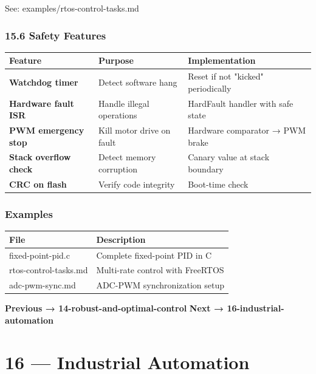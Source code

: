 \documentclass[11pt,a4paper]{book}
\begin{document}
\begin{itemize}
See: examples/rtos-control-tasks.md

\medskip\noindent\hrulefill\medskip

\subsection{15.6 Safety Features}

\begin{center}
\begin{tabular}{|l|l|l|}
\hline
Feature & Purpose & Implementation \\
\hline
\textbf{Watchdog timer} & Detect software hang & Reset if not "kicked" periodically \\
\textbf{Hardware fault ISR} & Handle illegal operations & HardFault handler with safe state \\
\textbf{PWM emergency stop} & Kill motor drive on fault & Hardware comparator → PWM brake \\
\textbf{Stack overflow check} & Detect memory corruption & Canary value at stack boundary \\
\textbf{CRC on flash} & Verify code integrity & Boot-time check \\
\hline
\end{tabular}
\end{center}

\medskip\noindent\hrulefill\medskip

\subsection{Examples}

\begin{center}
\begin{tabular}{|l|l|}
\hline
File & Description \\
\hline
fixed-point-pid.c & Complete fixed-point PID in C \\
rtos-control-tasks.md & Multi-rate control with FreeRTOS \\
adc-pwm-sync.md & ADC-PWM synchronization setup \\
\hline
\end{tabular}
\end{center}

\medskip\noindent\hrulefill\medskip

\textbf{Previous → 14-robust-and-optimal-control}  
\textbf{Next → 16-industrial-automation}


\chapter{16 — Industrial Automation}

\end{itemize}
\end{document}
